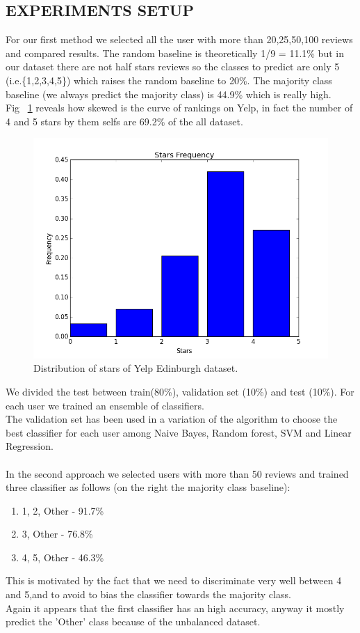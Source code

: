 \documentclass[11pt]{article}
\begin{document}
\subsection{EXPERIMENTS SETUP}
For our first method we selected all the user with more than 20,25,50,100 reviews and compared results. The random baseline is theoretically 1/9 = 11.1\% but in our dataset there are not half stars reviews so the classes to predict are only 5 (i.e.\{1,2,3,4,5\}) which raises the random baseline to 20\%.  The majority class baseline (we always predict the majority class) is 44.9\% which is really high.\\
Fig ~\ref{histStars} reveals how skewed is the curve of rankings on Yelp, in fact the number of 4 and 5 stars by them selfs are 69.2\% of the all dataset.
\begin{figure}[thpb]
	\centering
	\includegraphics[scale=0.4]{img/starsFrequency.png}
	\caption{Distribution of stars of Yelp Edinburgh dataset.}
	\label{histStars}
\end{figure}
We divided the test between train(80\%), validation set (10\%) and test (10\%).
For each user we trained an ensemble of classifiers.\\
The validation set has been used in a variation of the algorithm to choose the best classifier for each user among Naive Bayes, Random forest, SVM and Linear Regression.\\\\
In the second approach we selected users with more than 50 reviews and trained three classifier as follows (on the right the majority class baseline):
\begin{enumerate}
	\item 1, 2, Other - 91.7\%
	\item 3, Other - 76.8\%
	\item 4, 5, Other - 46.3\%
\end{enumerate}
This is motivated by the fact that we need to discriminate very well between 4 and 5,and to avoid to bias the classifier towards the majority class.\\
Again it appears that the first classifier has an high accuracy, anyway it mostly predict the 'Other' class because of the unbalanced dataset.\\
\end{document}
